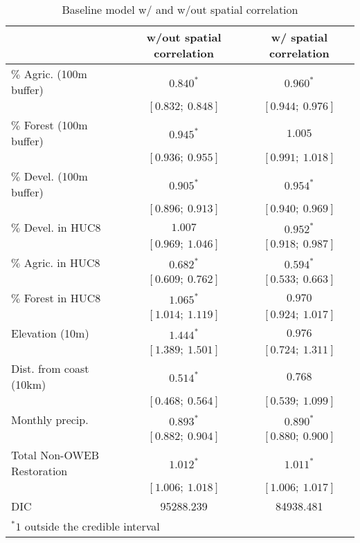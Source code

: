 
\begin{table}
\caption{Baseline model w/ and w/out spatial correlation}
\begin{center}
\begin{tabular}{l c c }
\hline
                           & w/out spatial correlation & w/ spatial correlation \\
\hline
$\%$  Agric. (100m buffer) & $0.840^{*}$       & $0.960^{*}$       \\
                           & $[0.832;\ 0.848]$ & $[0.944;\ 0.976]$ \\
$\%$  Forest (100m buffer) & $0.945^{*}$       & $1.005$           \\
                           & $[0.936;\ 0.955]$ & $[0.991;\ 1.018]$ \\
$\%$  Devel. (100m buffer) & $0.905^{*}$       & $0.954^{*}$       \\
                           & $[0.896;\ 0.913]$ & $[0.940;\ 0.969]$ \\
$\%$  Devel. in HUC8       & $1.007$           & $0.952^{*}$       \\
                           & $[0.969;\ 1.046]$ & $[0.918;\ 0.987]$ \\
$\%$  Agric. in HUC8       & $0.682^{*}$       & $0.594^{*}$       \\
                           & $[0.609;\ 0.762]$ & $[0.533;\ 0.663]$ \\
$\%$  Forest in HUC8       & $1.065^{*}$       & $0.970$           \\
                           & $[1.014;\ 1.119]$ & $[0.924;\ 1.017]$ \\
Elevation (10m)            & $1.444^{*}$       & $0.976$           \\
                           & $[1.389;\ 1.501]$ & $[0.724;\ 1.311]$ \\
Dist. from coast (10km)    & $0.514^{*}$       & $0.768$           \\
                           & $[0.468;\ 0.564]$ & $[0.539;\ 1.099]$ \\
Monthly precip.            & $0.893^{*}$       & $0.890^{*}$       \\
                           & $[0.882;\ 0.904]$ & $[0.880;\ 0.900]$ \\
Total Non-OWEB Restoration & $1.012^{*}$       & $1.011^{*}$       \\
                           & $[1.006;\ 1.018]$ & $[1.006;\ 1.017]$ \\
\hline
DIC                        & 95288.239         & 84938.481         \\
\hline
\multicolumn{3}{l}{\scriptsize{$^* 1$ outside the credible interval}}
\end{tabular}
\label{table:basemods}
\end{center}
\end{table}
